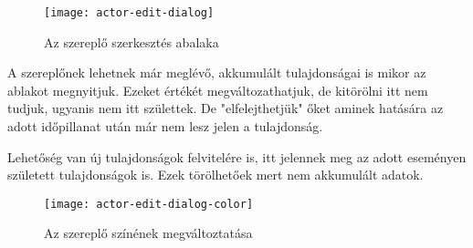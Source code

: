 \begin{figure}[h!]
	\centering
	\texttt{[image: actor-edit-dialog]}
	\caption{Az szereplő szerkesztés abalaka}
	\label{fig:actor-edit-dialog}
\end{figure}

A szereplőnek lehetnek már meglévő, akkumulált tulajdonságai is mikor az ablakot megnyitjuk. Ezeket értékét megváltozathatjuk, de kitörölni itt nem tudjuk, ugyanis nem itt születtek. De "elfelejthetjük" őket aminek hatására az adott időpillanat után már nem lesz jelen a tulajdonság.

Lehetőség van új tulajdonságok felvitelére is, itt jelennek meg az adott eseményen született tulajdonságok is. Ezek törölhetőek mert nem akkumulált adatok.

\begin{figure}[h!]
	\centering
	\texttt{[image: actor-edit-dialog-color]}
	\caption{Az szereplő színének megváltoztatása}
	\label{fig:actor-edit-dialog-color}
\end{figure}


